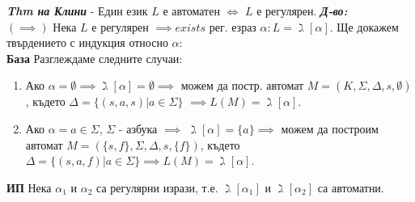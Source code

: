 \documentclass[fleqn,12pt]{article}
\begin{document}
\begin{flushleft}
\textit{\textbf{Thm на Клини}} - Един език $L$ е автоматен $\iff$ $L$ е регулярен.
\textit{\textbf{Д-во:}}\\
$(\implies)$ Нека $L$ е регулярен $\implies exists$ рег. езраз $\alpha: L = \gimel[\alpha]$. Ще докажем твърдението с индукция относно $\alpha$: \\
\textbf{База} Разглеждаме следните случаи:
\begin{enumerate}
    \item Ако $\alpha = \emptyset \implies \gimel[\alpha] = \emptyset \implies$ можем да постр. автомат $M = (K, \Sigma, \Delta, s, \emptyset)$, където $\Delta = \{(s, a, s) | a \in \Sigma\}$ $\implies L(M) = \gimel[\alpha]$. \\
    \item Ако $\alpha = a \in \Sigma$, $\Sigma$ - азбука $\implies$ $\gimel[\alpha] = \{a\} \implies$ можем да построим автомат $M = (\{s, f\}, \Sigma, \Delta, s, \{f\})$, където $\Delta = \{(s, a, f) | a \in \Sigma\} \implies L(M) = \gimel[\alpha]$.\\
\end{enumerate}

\textbf{ИП} Нека $\alpha_1$ и $\alpha_2$ са регулярни изрази, т.е. $\gimel[\alpha_1]$ и $\gimel[\alpha_2]$ са автоматни.


\end{flushleft}
\end{document}
